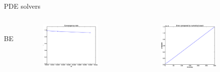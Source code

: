 \documentclass[12pt,a4paper, xcolor={usenames,dvipsnames,svgnames,table}]{beamer}
\begin{document}
\begin{frame}[shrink]{PDE solvers}
\begin{columns}
\vspace{5pt}\\ BE
 \begin{figure}[h!]
 \centering
  \includegraphics[width=0.8\textwidth]{../../results/experiment_14052014_0744_errorplot_BE1D/results/ConvergenceTest.eps}
 \end{figure}
 \begin{figure}[h!]
 \centering
  \includegraphics[width=0.8\textwidth]{../../results/experiment_14042014_0759_BE1D_numerical_exact/results/numerical_exact.eps}
 \end{figure}


\end{columns}
\end{frame}
\end{document}
